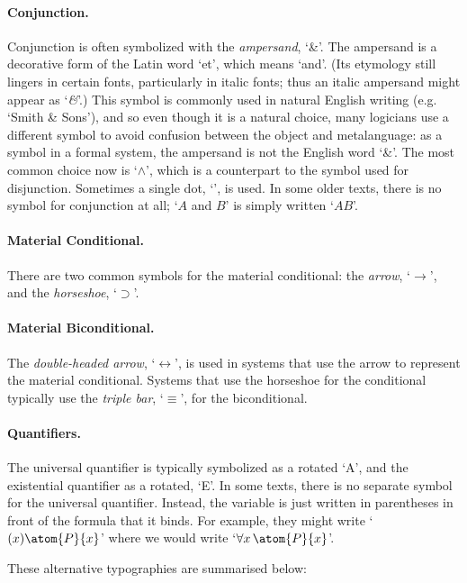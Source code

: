 \paragraph{Conjunction.}
Conjunction is often symbolized with the \emph{ampersand}, `{\&}'. The ampersand is a decorative form of the Latin word `et', which means `and'.  (Its etymology still lingers in certain fonts, particularly in italic fonts; thus an italic ampersand might appear as `\emph{\&}'.) This symbol is commonly used in natural English writing (e.g.  `Smith \& Sons'), and so even though it is a natural choice, many logicians use a different symbol to avoid confusion between the object and metalanguage: as a symbol in a formal system, the ampersand is not the English word `\&'. The most common choice now is `$\wedge$', which is a counterpart to the symbol used for disjunction. Sometimes a single dot, `{\scriptsize\textbullet}', is used. In some older texts, there is no symbol for conjunction at all; `$A$ and $B$' is simply written `$AB$'.

\paragraph{Material Conditional.} There are two common symbols for the material conditional: the \emph{arrow}, `$\rightarrow$', and the \emph{horseshoe}, `$\supset$'.

\paragraph{Material Biconditional.} The \emph{double-headed arrow}, `$\leftrightarrow$', is used in systems that use the arrow to represent the material conditional. Systems that use the horseshoe for the conditional typically use the \emph{triple bar}, `$\equiv$', for the biconditional.

\paragraph{Quantifiers.} The universal quantifier is typically symbolized as a rotated `A', and the existential quantifier as a rotated, `E'. In some texts, there is no separate symbol for the universal quantifier. Instead, the variable is just written in parentheses in front of the formula that it binds. For example, they might write `$(x)\atom{P}{x}$' where we would write `$\forall x\, \atom{P}{x}$'.

\bigskip

These alternative typographies are summarised below:

